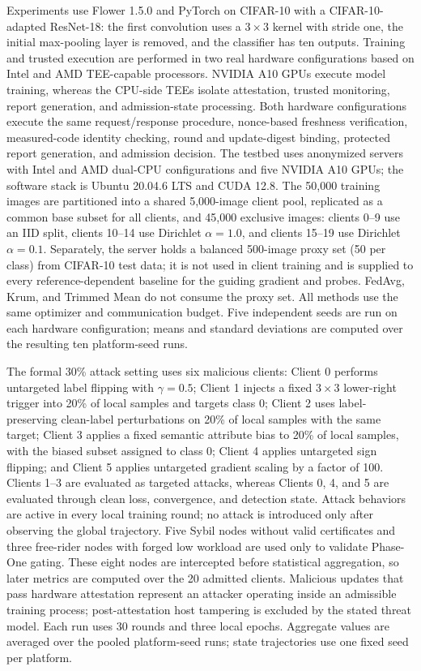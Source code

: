 \documentclass[runningheads,orivec]{llncs}
\begin{document}
Experiments use Flower 1.5.0 and PyTorch on CIFAR-10 with a CIFAR-10-adapted ResNet-18: the first convolution uses a $3\times3$ kernel with stride one, the initial max-pooling layer is removed, and the classifier has ten outputs. Training and trusted execution are performed in two real hardware configurations based on Intel and AMD TEE-capable processors. NVIDIA A10 GPUs execute model training, whereas the CPU-side TEEs isolate attestation, trusted monitoring, report generation, and admission-state processing. Both hardware configurations execute the same request/response procedure, nonce-based freshness verification, measured-code identity checking, round and update-digest binding, protected report generation, and admission decision. The testbed uses anonymized servers with Intel and AMD dual-CPU configurations and five NVIDIA A10 GPUs; the software stack is Ubuntu 20.04.6 LTS and CUDA 12.8. The 50,000 training images are partitioned into a shared 5,000-image client pool, replicated as a common base subset for all clients, and 45,000 exclusive images: clients 0--9 use an IID split, clients 10--14 use Dirichlet $\alpha=1.0$, and clients 15--19 use Dirichlet $\alpha=0.1$. Separately, the server holds a balanced 500-image proxy set (50 per class) from CIFAR-10 test data; it is not used in client training and is supplied to every reference-dependent baseline for the guiding gradient and probes. FedAvg, Krum, and Trimmed Mean do not consume the proxy set. All methods use the same optimizer and communication budget. Five independent seeds are run on each hardware configuration; means and standard deviations are computed over the resulting ten platform-seed runs.

The formal 30\% attack setting uses six malicious clients: Client 0 performs untargeted label flipping with $\gamma=0.5$; Client 1 injects a fixed $3\times3$ lower-right trigger into 20\% of local samples and targets class 0; Client 2 uses label-preserving clean-label perturbations on 20\% of local samples with the same target; Client 3 applies a fixed semantic attribute bias to 20\% of local samples, with the biased subset assigned to class 0; Client 4 applies untargeted sign flipping; and Client 5 applies untargeted gradient scaling by a factor of 100. Clients 1--3 are evaluated as targeted attacks, whereas Clients 0, 4, and 5 are evaluated through clean loss, convergence, and detection state. Attack behaviors are active in every local training round; no attack is introduced only after observing the global trajectory. Five Sybil nodes without valid certificates and three free-rider nodes with forged low workload are used only to validate Phase-One gating. These eight nodes are intercepted before statistical aggregation, so later metrics are computed over the 20 admitted clients. Malicious updates that pass hardware attestation represent an attacker operating inside an admissible training process; post-attestation host tampering is excluded by the stated threat model. Each run uses 30 rounds and three local epochs. Aggregate values are averaged over the pooled platform-seed runs; state trajectories use one fixed seed per platform.
\end{document}
